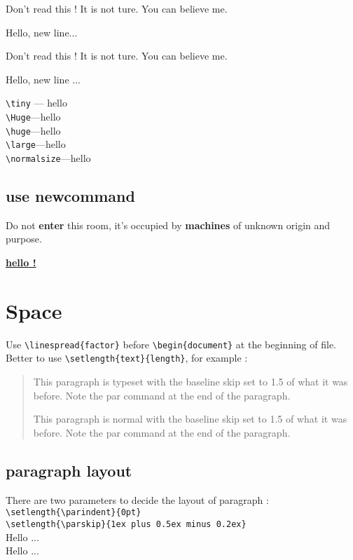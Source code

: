 \documentclass[a4paper,12pt,titlepage]{article}
\begin{document}
{\Large Don't read this !
It is not ture. You can believe me. \par
}

Hello, new line...

{\Large Don't read this !
It is not ture. You can believe me.
} \par

Hello, new line ...

\noindent\verb|\tiny| --- {\tiny hello} \\
\verb|\Huge|---{\Huge hello} \\
\verb|\huge|---{\huge hello} \\
\verb|\large|---{\large hello} \\
\verb|\normalsize|---{\normalsize hello} \\

\subsection{use newcommand}
\newcommand{\oops}[1]{\textbf{#1}}

Do not \oops{enter} this room, it's occupied by \oops{machines} of unknown origin and purpose.

\underline{\textbf{hello !}}

\section{Space}
Use \verb|\linespread{factor}| before \verb|\begin{document}| at the beginning of file. \\
Better to use \verb|\setlength{text}{length}|, for example :\\
\begin{quote}
{\setlength{\baselineskip}{1.5\baselineskip}
This paragraph is typeset with the baseline skip set to 1.5 of what it was before. Note the par command at the end of the paragraph. \par
}
This paragraph is normal with the baseline skip set to 1.5 of what it was before. Note the par command at the end of the paragraph.
\end{quote}

\subsection{paragraph layout}
There are two parameters to decide the layout of paragraph :\\
{\centering
\verb|\setlength{\parindent}{0pt}|\\
\verb|\setlength{\parskip}{1ex plus 0.5ex minus 0.2ex}| \\
}
Hello ...\\
\indent Hello ...\\
\end{document}
